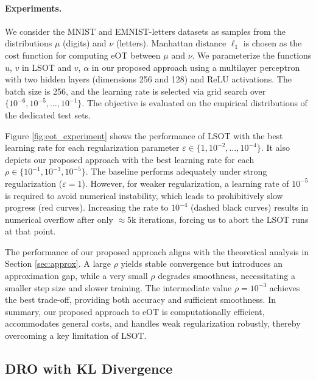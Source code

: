 \documentclass{article}
\theoremstyle{plain}
\theoremstyle{definition}
\theoremstyle{remark}
\begin{document}
\paragraph{Experiments.}
 {We consider the MNIST \citep{deng2012mnist} and EMNIST-letters \citep{cohen2017emnist} datasets as samples from the distributions $\mu$ (digits) and $\nu$ (letters).
Manhattan distance $\ell_1$ is chosen as the cost function for computing eOT between $\mu$ and $\nu$.
We parameterize the functions $u$, $v$ in LSOT and $v$, $\alpha$ in our proposed approach using a multilayer perceptron with two hidden layers (dimensions 256 and 128) and ReLU activations. The batch size is 256, and the learning rate is selected via grid search over \( \{10^{-6}, 10^{-5}, \ldots, 10^{-1}\} \). The objective is evaluated on the empirical distributions of the dedicated test sets.

Figure \ref{fig:eot_experiment} shows the performance of LSOT with the best learning rate for each regularization parameter \( \varepsilon \in \{1, 10^{-2}, \ldots, 10^{-4}\} \). It also depicts our proposed approach with the best learning rate for each $\rho \in \{10^{-1}, 10^{-3}, 10^{-5}\}$.
The baseline performs adequately under strong regularization ($\varepsilon=1$). However, for weaker regularization, a learning rate of $10^{-5}$ is required to avoid numerical instability, which leads to prohibitively slow progress (red curves). Increasing the rate to $10^{-4}$ (dashed black curves) results in numerical overflow after only $\approx$5k iterations, forcing us to abort the LSOT runs at that point. 

The performance of our proposed approach aligns with the theoretical analysis in Section \ref{sec:approx}. A large $\rho$ yields stable convergence but introduces an approximation gap, while a very small $\rho$ degrades smoothness, necessitating a smaller step size and slower training. The intermediate value $\rho=10^{-3}$ achieves the best trade-off, providing both accuracy and sufficient smoothness. In summary, our proposed approach to eOT is computationally efficient, accommodates general costs, and handles weak regularization robustly, thereby overcoming a key limitation of LSOT.}




\subsection{DRO with KL Divergence}
\end{document}
